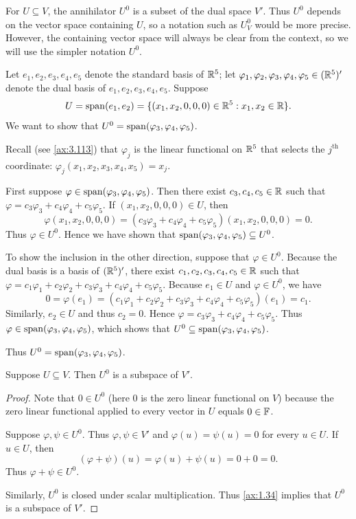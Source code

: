 For $U\subseteq V$, the annihilator $U^0$ is a subset of the dual space $V'$.
Thus $U^0$ depends on the vector space containing $U$, so a notation such as
$U_V^0$ would be more precise. However, the containing vector space will always
be clear from the context, so we will use the simpler notation $U^0$.

\begin{example}\label{ax:3.123}
Let $e_1,e_2,e_3,e_4,e_5$ denote the standard basis of $\mathbb{R}^5$; let
$\varphi_1,\varphi_2,\varphi_3,\varphi_4,\varphi_5\in(\mathbb{R}^5)'$ denote the dual
basis of $e_1,e_2,e_3,e_4,e_5$. Suppose
\[ U = \operatorname{span}(e_1,e_2) = \{(x_1,x_2,0,0,0)\in\mathbb{R}^5 : x_1,x_2\in\mathbb{R}\}. \]
We want to show that $U^0=\operatorname{span}(\varphi_3,\varphi_4,\varphi_5)$.

Recall (see \ref{ax:3.113}) that $\varphi_j$ is the linear functional on $\mathbb{R}^5$
that selects the $j^{\text{th}}$ coordinate:
$\varphi_j(x_1,x_2,x_3,x_4,x_5)=x_j$.

First suppose $\varphi\in\operatorname{span}(\varphi_3,\varphi_4,\varphi_5)$. Then there exist
$c_3,c_4,c_5\in\mathbb{R}$ such that $\varphi=c_3\varphi_3+c_4\varphi_4+c_5\varphi_5$.
If $(x_1,x_2,0,0,0)\in U$, then
\[ \varphi(x_1,x_2,0,0,0)
   = (c_3\varphi_3+c_4\varphi_4+c_5\varphi_5)(x_1,x_2,0,0,0) = 0. \]
Thus $\varphi\in U^0$. Hence we have shown that
$\operatorname{span}(\varphi_3,\varphi_4,\varphi_5)\subseteq U^0$.

To show the inclusion in the other direction, suppose that $\varphi\in U^0$.
Because the dual basis is a basis of $(\mathbb{R}^5)'$, there exist
$c_1,c_2,c_3,c_4,c_5\in\mathbb{R}$ such that
$\varphi=c_1\varphi_1+c_2\varphi_2+c_3\varphi_3+c_4\varphi_4+c_5\varphi_5$.
Because $e_1\in U$ and $\varphi\in U^0$, we have
\[ 0 = \varphi(e_1)
   = (c_1\varphi_1+c_2\varphi_2+c_3\varphi_3+c_4\varphi_4+c_5\varphi_5)(e_1)
   = c_1. \]
Similarly, $e_2\in U$ and thus $c_2=0$. Hence
$\varphi=c_3\varphi_3+c_4\varphi_4+c_5\varphi_5$. Thus
$\varphi\in\operatorname{span}(\varphi_3,\varphi_4,\varphi_5)$, which shows that
$U^0\subseteq\operatorname{span}(\varphi_3,\varphi_4,\varphi_5)$.

Thus $U^0=\operatorname{span}(\varphi_3,\varphi_4,\varphi_5)$.
\end{example}

\begin{result}\label{ax:3.124}
Suppose $U\subseteq V$. Then $U^0$ is a subspace of $V'$.
\end{result}

\begin{proof}
Note that $0\in U^0$ (here $0$ is the zero linear functional on $V$) because the
zero linear functional applied to every vector in $U$ equals $0\in\mathbb{F}$.

Suppose $\varphi,\psi\in U^0$. Thus $\varphi,\psi\in V'$ and
$\varphi(u)=\psi(u)=0$ for every $u\in U$. If $u\in U$, then
\[ (\varphi+\psi)(u) = \varphi(u)+\psi(u) = 0+0 = 0. \]
Thus $\varphi+\psi\in U^0$.

Similarly, $U^0$ is closed under scalar multiplication. Thus \ref{ax:1.34}
implies that $U^0$ is a subspace of $V'$.
\end{proof}

